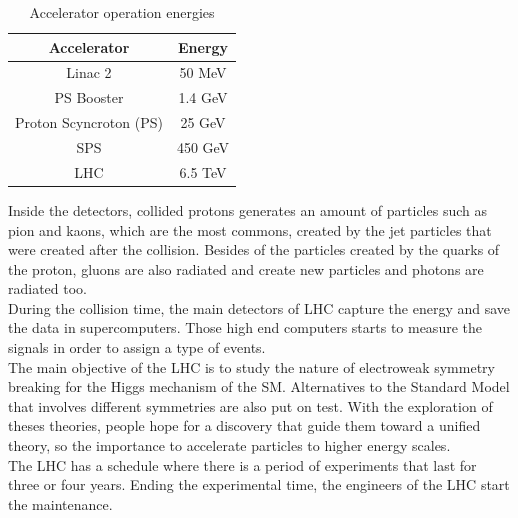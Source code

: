 \begin{table}[!htbp]
\centering
	\caption{Accelerator operation energies\cite{cern3,cern1}}
	\begin{tabular}{|c|c|}
		\hline
		Accelerator & Energy \\
		\hline
		Linac 2 & 50 MeV \\
		\hline
		PS Booster & 1.4 GeV \\
		\hline
		Proton Scyncroton (PS) & 25 GeV\\
		\hline
		SPS & 450 GeV\\
		\hline
		LHC & 6.5 TeV\\
		\hline
	\end{tabular}
\end{table}
\pagebreak
Inside the detectors, collided protons generates an amount of particles such as pion and kaons, which are the most commons, created by the jet particles that were created after the collision. Besides of the particles created by the quarks of the proton, gluons are also radiated and create new particles and photons are radiated too. \\
During the collision time, the main detectors of LHC capture the energy 
and save the data in supercomputers. Those high end computers starts to measure the signals in order to assign a type of events.
\\

The main objective of the LHC is to study the nature of electroweak symmetry breaking for the Higgs mechanism of the SM. 
Alternatives to the Standard Model that involves different symmetries are also put on test. With the exploration of theses theories, people hope for a discovery that guide them toward a unified theory, so the importance to accelerate particles to higher energy scales.
\\
The LHC has a schedule where there is a period of experiments that last for three or four years. Ending the experimental time, the engineers of the LHC start the maintenance.

